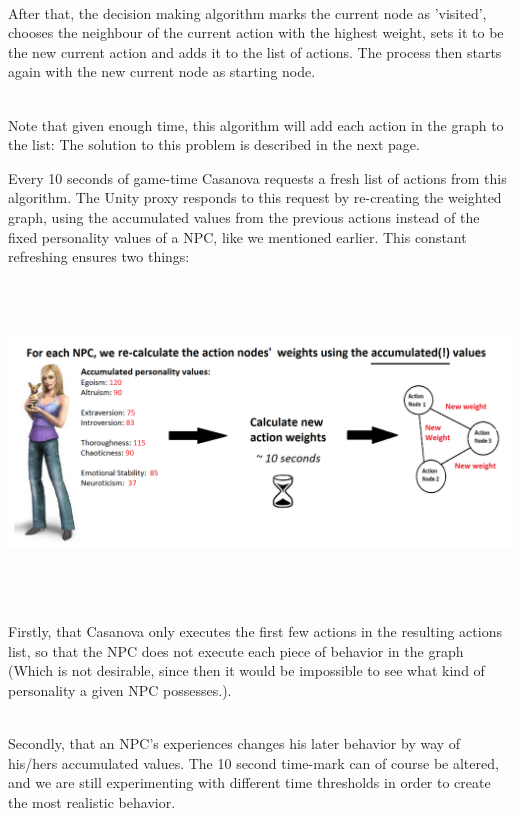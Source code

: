 \documentclass[11pt]{article} %
\begin{document}
~\\
After that, the decision making algorithm marks the current node as 'visited', chooses the neighbour of the current action with the highest weight, sets it to be the new current action and adds it to the list of actions. The process then starts again with the new current node as starting node. 

~\\
Note that given enough time, this algorithm will add each action in the graph to the list: The solution to this problem is described in the next page.



\newpage
Every 10 seconds of game-time Casanova requests a fresh list of actions from this algorithm. The Unity proxy responds to this request by re-creating the weighted graph, using the accumulated values from the previous actions instead of the fixed personality values of a NPC, like we mentioned earlier. This constant refreshing ensures two things: 

~\\
\includegraphics[width=17cm, height=7.5cm]{AccumulatedValues}

~\\
Firstly, that Casanova only executes the first few actions in the resulting actions list, so that the NPC does not execute each piece of behavior in the graph (Which is not desirable, since then it would be impossible to see what kind of personality a given NPC possesses.). 

~\\
Secondly, that an NPC's experiences changes his later behavior by way of his/hers accumulated values. 
The 10 second time-mark can of course be altered, and we are still experimenting with different time thresholds in order to create the most realistic behavior.
\end{document}
